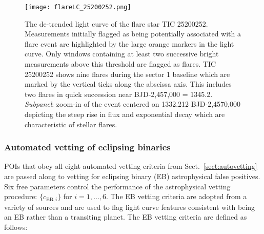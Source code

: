 \begin{figure}
  \centering
  \texttt{[image: flareLC\_25200252.png]}
  \caption{The de-trended light curve of the flare star TIC 25200252. Measurements initially flagged
    as being potentially associated with a flare event are highlighted by the
    large orange markers in the light curve. Only windows containing at least two successive
    bright measurements above this threshold are flagged as flares. TIC 25200252 shows nine flares
    during the \tess{} sector 1 baseline which are marked by the vertical ticks along the abscissa axis.
    This includes two flares in quick succession near BJD-2,457,000 = 1345.2.
    \emph{Subpanel}: zoom-in of the event centered on 1332.212 BJD-2,4570,000 depicting the steep rise
    in flux and exponential decay which are characteristic of stellar flares.}
  \label{fig:flare}
\end{figure}


\subsubsection{Automated vetting of eclipsing binaries} \label{sect:autoEB}
POIs that obey all eight automated vetting criteria from Sect.~\ref{sect:autovetting}
are passed along to vetting for eclipsing binary (EB) astrophysical false
positives. Six free parameters control the
performance of the astrophysical vetting procedure: $\{c_{\text{EB},i}\}$ for $i=1,\dots,6$.
The EB vetting criteria are adopted from a variety of sources
\citep{batalha10,bryson13,gunther17,crossfield18}
and are used to flag light curve features consistent with being an EB rather than a transiting
planet. The EB vetting criteria are defined as follows:

